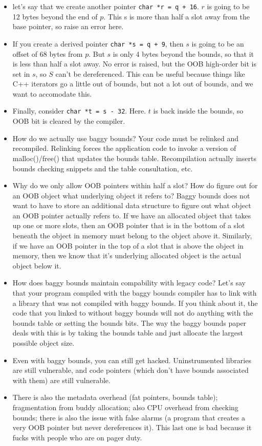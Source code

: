 \documentclass[12pt]{article}
\theoremstyle{definition}
\begin{document}
\begin{itemize}
    \item let's say that we create another pointer \texttt{char *r = q + 16}. $r$ is going to be 12 bytes beyond the end of $p$. This s is more than half a slot away from the base pointer, so raise an error here.
    \item If you create a derived pointer \texttt{char *s = q + 9}, then $s$ is going to be an offset of 68 bytes from $p$. But $s$ is only 4 bytes beyond the bounds, so that it is less than half a slot away. No error is raised, but the OOB high-order bit is set in $s$, so $S$ can't be dereferenced. This can be useful because things like C++ iterators go a little out of bounds, but not a lot out of bounds, and we want to accomodate this.
    \item Finally, consider \texttt{char *t = s - 32}. Here. $t$ is back inside the bounds, so OOB bit is cleared by the compiler.
    \item How do we actually use baggy bounds? Your code must be relinked and recompiled. Relinking forces the application code to invoke a version of malloc()/free() that updates the bounds table. Recompilation actually inserts bounds checking snippets and the table consultation, etc.
    \item Why do we only allow OOB pointers within half a slot? How do figure out for an OOB object what underlying object it refers to? Baggy bounds does not want to have to store an additional data structure to figure out what object an OOB pointer actually refers to. If we have an allocated object that takes up one or more slots, then an OOB pointer that is in the bottom of a slot beneath the object in memory must belong to the object above it. Similarly, if we have an OOB pointer in the top of a slot that is above the object in memory, then we know that it's underlying allocated object is the actual object below it.
    \item How does baggy bounds maintain compability with legacy code? Let's say that your program compiled with the baggy bounds compiler has to link with a library that was not compiled with baggy bounds. If you think about it, the code that you linked to without baggy bounds will not do anything with the bounds table or setting the bounds bits. The way the baggy bounds paper deals with this is by taking the bounds table and just allocate the largest possible object size.
    \item Even with baggy bounds, you can still get hacked. Uninstrumented libraries are still vulnerable, and code pointers (which don't have bounds associated with them) are still vulnerable.
    \item There is also the metadata overhead (fat pointers, bounds table); fragmentation from buddy allocation; also CPU overhead from checking bounds; there is also the issue with false alarms (a program that creates a very OOB pointer but never dereferences it). This last one is bad because it fucks with people who are on pager duty.
\end{itemize}
\end{document}
